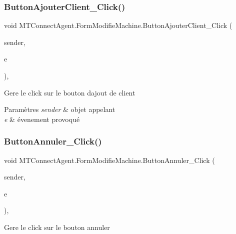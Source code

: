 \subsubsection{\texorpdfstring{Button\+Ajouter\+Client\+\_\+\+Click()}{ButtonAjouterClient\_Click()}}
{\footnotesize\ttfamily void M\+T\+Connect\+Agent.\+Form\+Modifie\+Machine.\+Button\+Ajouter\+Client\+\_\+\+Click (\begin{DoxyParamCaption}\item[{object}]{sender,  }\item[{Event\+Args}]{e }\end{DoxyParamCaption})\hspace{0.3cm}{\ttfamily [inline]}, {\ttfamily [private]}}



Gere le click sur le bouton d\textquotesingle{}ajout de client 


\begin{DoxyParams}{Paramètres}
{\em sender} & objet appelant\\
\hline
{\em e} & évenement provoqué\\
\hline
\end{DoxyParams}
\mbox{\label{class_m_t_connect_agent_1_1_form_modifie_machine_a20ee7087b2ef87582c8c04710d91345e}} 
\subsubsection{\texorpdfstring{Button\+Annuler\+\_\+\+Click()}{ButtonAnnuler\_Click()}}
{\footnotesize\ttfamily void M\+T\+Connect\+Agent.\+Form\+Modifie\+Machine.\+Button\+Annuler\+\_\+\+Click (\begin{DoxyParamCaption}\item[{object}]{sender,  }\item[{Event\+Args}]{e }\end{DoxyParamCaption})\hspace{0.3cm}{\ttfamily [inline]}, {\ttfamily [private]}}



Gere le click sur le bouton annuler 


